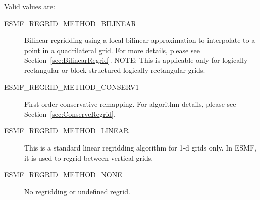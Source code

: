 Valid values are:
\begin{description}

\item [ESMF\_REGRID\_METHOD\_BILINEAR]
     Bilinear regridding using a local bilinear approximation to interpolate
     to a point in a quadrilateral grid.  For more details, please see
     Section~\ref{sec:BilinearRegrid}.  NOTE: This is applicable only for
     logically-rectangular or block-structured logically-rectangular grids.

\item[ESMF\_REGRID\_METHOD\_CONSERV1]
     First-order conservative remapping.  For algorithm details, please see
     Section~\ref{sec:ConserveRegrid}.

\item[ESMF\_REGRID\_METHOD\_LINEAR  ]
     This is a standard linear regridding algorithm for 1-d grids only.  In ESMF,
     it is used to regrid between vertical grids.

\item [ESMF\_REGRID\_METHOD\_NONE]
     No regridding or undefined regrid.
\end{description}



